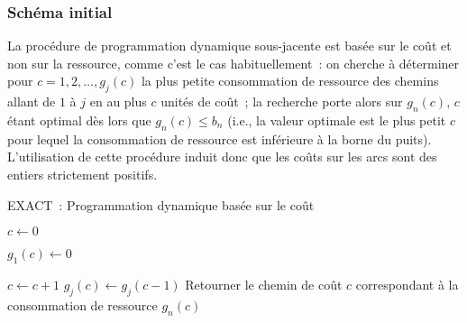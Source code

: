 \documentclass[10pt,francais]{llncs}
\begin{document}
\subsubsection{Sch\'ema initial}\label{subsub-approx-fptas-hassin}
La proc\'edure de programmation dynamique sous-jacente est bas\'ee sur le co\^ut et non sur la ressource, comme c'est le cas habituellement~: on cherche \`a d\'eterminer pour $c=1, 2, \ldots, g_j(c)$ la plus petite consommation de ressource des chemins allant de $1$ \`a $j$ en au plus $c$ unit\'es de co\^ut~; la recherche porte alors sur $g_n(c)$, $c$ \'etant optimal d\`es lors que $g_n(c) \leq b_n$ (i.e., la valeur optimale est le plus petit $c$ pour lequel la consommation de ressource est inf\'erieure \`a la borne du puits). L'utilisation de cette proc\'edure induit donc que les co\^uts sur les arcs sont des entiers strictement positifs.

\begin{algorithm}\label{algo-exact}
\caption{EXACT~: Programmation dynamique bas\'ee sur le co\^ut}
\BlankLine

{$c\leftarrow 0$}\;

{$g_1(c) \leftarrow 0$}\;

\;

{
	{$c \leftarrow c + 1$}\;
	{
	 	$g_j(c)\leftarrow g_j(c-1)$\;
		{
	  		\;
		}
	}
}
Retourner le chemin de co\^ut $c$ correspondant \`a la consommation de ressource $g_n(c)$
\end{algorithm}
\end{document}
